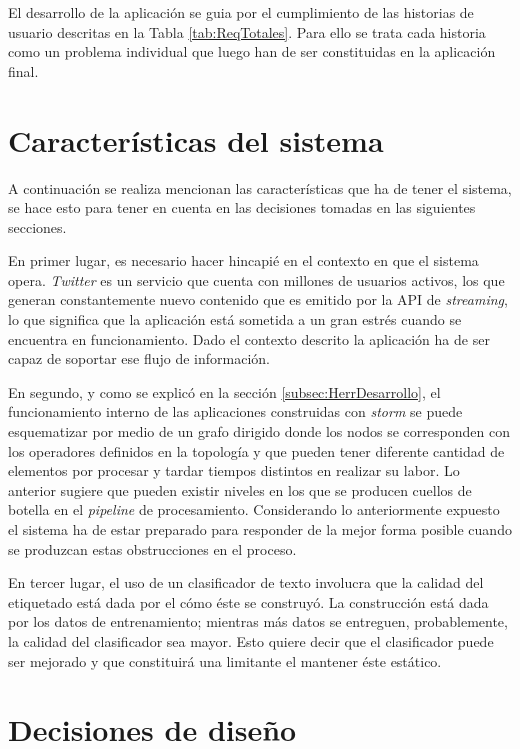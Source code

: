 El desarrollo de la aplicación se guia por el cumplimiento de las historias de usuario descritas en la Tabla \ref{tab:ReqTotales}. Para ello se trata cada historia como un problema individual que luego han de ser constituidas en la aplicación final.

\section{Características del sistema}
\label{sec:caracteristicasSistema}

A continuación se realiza mencionan las características que ha de tener el sistema, se hace esto para tener en cuenta en las decisiones tomadas en las siguientes secciones.

En primer lugar, es necesario hacer hincapié en el contexto en que el sistema opera. \textit{Twitter} es un servicio que cuenta con millones de usuarios activos, los que generan constantemente nuevo contenido que es emitido por la API de \textit{streaming}, lo que significa que la aplicación está sometida a un gran estrés cuando se encuentra en funcionamiento. Dado el contexto descrito la aplicación ha de ser capaz de soportar ese flujo de información.

En segundo, y como se explicó en la sección \ref{subsec:HerrDesarrollo}, el funcionamiento interno de las aplicaciones construidas con \textit{storm} se puede esquematizar por medio de un grafo dirigido donde los nodos se corresponden con los operadores definidos en la topología y que pueden tener diferente cantidad de elementos por procesar y tardar tiempos distintos en realizar su labor. Lo anterior sugiere que pueden existir niveles en los que se producen cuellos de botella en el \textit{pipeline} de procesamiento. Considerando lo anteriormente expuesto el sistema ha de estar preparado para responder de la mejor forma posible cuando se produzcan estas obstrucciones en el proceso.

En tercer lugar, el uso de un clasificador de texto involucra que la calidad del etiquetado está dada por el cómo éste se construyó. La construcción está dada por los datos de entrenamiento; mientras más datos se entreguen, probablemente, la calidad del clasificador sea mayor. Esto quiere decir que el clasificador puede ser mejorado y que constituirá una limitante el mantener éste estático.

\section{Decisiones de diseño}
\label{sec:decDiseno}

